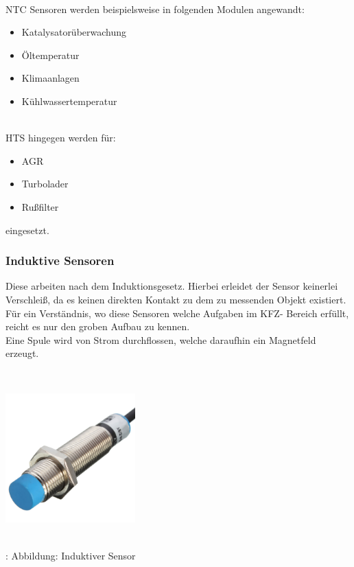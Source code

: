 \documentclass{article}
\begin{document}
				\begin{flushleft}
					\\	
					NTC Sensoren werden beispielsweise in folgenden Modulen angewandt:
					
					\begin{itemize}
						\item Katalysatorüberwachung
						\item Öltemperatur
						\item Klimaanlagen
						\item Kühlwassertemperatur 	
					\end{itemize}
					\\
					HTS hingegen werden für:

					\begin{itemize}
						\item AGR
						\item Turbolader
						\item Rußfilter 
					\end{itemize}
					eingesetzt.

				\end{flushleft}
		
			\subsubsection{Induktive Sensoren}
				
				\begin{flushleft}
					
					Diese arbeiten nach dem Induktionsgesetz. 
					Hierbei erleidet der Sensor keinerlei Verschleiß, da es keinen direkten Kontakt zu dem zu messenden Objekt existiert.\\
					Für ein Verständnis, wo diese Sensoren welche Aufgaben im KFZ- Bereich erfüllt, reicht es nur den groben Aufbau zu kennen.\\
					Eine Spule wird von Strom durchflossen, welche daraufhin ein Magnetfeld erzeugt.\\	
			
				\end{flushleft}		
			\\
				\begin{center}
					\includegraphics[width=5cm, height=5cm] {Images/Kapitel5/induktiv.png}
					\caption{\\\cite{TS07}: Abbildung: Induktiver Sensor}
				\end{center}
			\\
			
\end{document}
